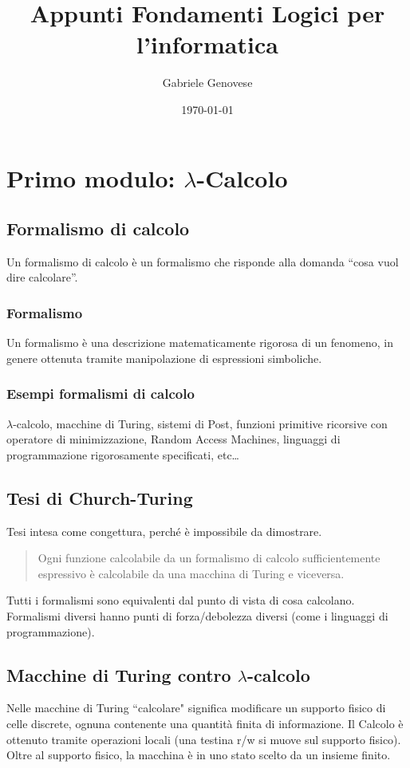 \documentclass{article}
\title{Appunti Fondamenti Logici per l'informatica}
\author{Gabriele Genovese}
\date{\today}
\begin{document}
\maketitle

\tableofcontents

\newpage

\section{Primo modulo: $\lambda$-Calcolo}

\subsection{Formalismo di calcolo}
Un formalismo di calcolo è un formalismo che risponde alla domanda “cosa vuol dire calcolare”.

\subsubsection{Formalismo}
Un formalismo è una descrizione matematicamente rigorosa di un fenomeno, in genere ottenuta tramite manipolazione di espressioni simboliche.
        
\subsubsection{Esempi formalismi di calcolo}
$\lambda$-calcolo, macchine di Turing, sistemi di Post, funzioni primitive ricorsive con operatore di minimizzazione, Random Access Machines, linguaggi di programmazione rigorosamente specificati, etc\ldots
     
\subsection{Tesi di Church-Turing}   
Tesi intesa come congettura, perché è impossibile da dimostrare.
\begin{quote}
Ogni funzione calcolabile da un formalismo di calcolo sufficientemente espressivo è calcolabile da una macchina di Turing e viceversa.
\end{quote}
Tutti i formalismi sono equivalenti dal punto di vista di cosa calcolano. Formalismi diversi hanno punti di forza/debolezza diversi (come i linguaggi di programmazione).
    
\subsection{Macchine di Turing contro $\lambda$-calcolo}
Nelle macchine di Turing ``calcolare" significa modificare un supporto fisico di celle discrete, ognuna contenente una quantità finita di informazione. Il Calcolo è ottenuto tramite operazioni locali (una testina r/w si muove sul supporto fisico). Oltre al supporto fisico, la macchina è in uno stato scelto da un insieme finito.
\end{document}
